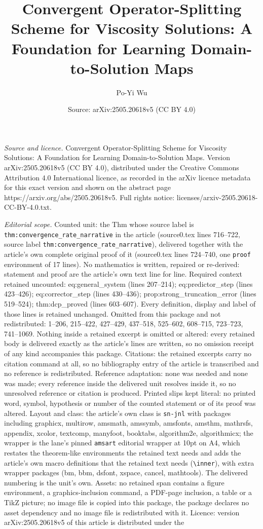 \documentclass[10pt,a4paper]{amsart}
\title[Convergent Operator-Splitting Scheme for Viscosity Solutions]{Convergent Operator-Splitting Scheme for Viscosity Solutions: A Foundation for Learning Domain-to-Solution Maps}
\author{Po-Yi Wu}
\date{Source: arXiv:2505.20618v5 (CC BY 4.0)}
\begin{document}
\maketitle

\noindent\emph{Source and licence.} Convergent Operator-Splitting Scheme for Viscosity Solutions: A Foundation for Learning Domain-to-Solution Maps. Version arXiv:2505.20618v5 (CC BY 4.0), distributed under the Creative Commons Attribution 4.0 International licence, as recorded in the arXiv licence metadata for this exact version and shown on the abstract page https://arxiv.org/abs/2505.20618v5. Full rights notice: licenses/arxiv-2505.20618-CC-BY-4.0.txt.\par\smallskip

\noindent\textit{Editorial scope.} Counted unit: the Thm whose source label is \texttt{thm:convergence\_rate\_narrative} in the article (source0.tex lines 716--722, source label \texttt{thm:convergence\_rate\_narrative}), delivered together with the article's own complete original proof of it (source0.tex lines 724--740, one \texttt{proof} environment of 17 lines). No mathematics is written, repaired or re-derived: statement and proof are the article's own text line for line. Required context retained uncounted: eq:general\_system (lines 207--214); eq:predictor\_step (lines 423--426); eq:corrector\_step (lines 430--436); prop:strong\_truncation\_error (lines 519--524); thm:dcp\_proved (lines 603--607). Every definition, display and label of those lines is retained unchanged. Omitted from this package and not redistributed: 1--206, 215--422, 427--429, 437--518, 525--602, 608--715, 723--723, 741--1069. Nothing inside a retained excerpt is omitted or altered: every retained body is delivered exactly as the article's lines are written, so no omission receipt of any kind accompanies this package. Citations: the retained excerpts carry no citation command at all, so no bibliography entry of the article is transcribed and no reference is redistributed. Reference adaptation: none was needed and none was made; every reference inside the delivered unit resolves inside it, so no unresolved reference or citation is produced. Printed slips kept literal: no printed word, symbol, hypothesis or number of the counted statement or of its proof was altered. Layout and class: the article's own class is \texttt{sn-jnl} with packages including graphicx, multirow, amsmath, amssymb, amsfonts, amsthm, mathrsfs, appendix, xcolor, textcomp, manyfoot, booktabs, algorithm2e, algorithmicx; the wrapper is the lane's pinned \texttt{amsart} editorial wrapper at 10pt on A4, which restates the theorem-like environments the retained text needs and adds the article's own macro definitions that the retained text needs (\texttt{\textbackslash inner}), with extra wrapper packages (bm, bbm, dsfont, xspace, cancel, mathtools). The delivered numbering is the unit's own. Assets: no retained span contains a figure environment, a graphics-inclusion command, a PDF-page inclusion, a table or a TikZ picture; no image file is copied into this package, the package declares no asset dependency and no image file is redistributed with it. Licence: version arXiv:2505.20618v5 of this article is distributed under the 
\end{document}
